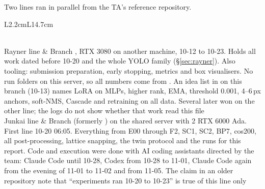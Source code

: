 Two lines ran in parallel from the TA's reference repository.

\begin{lt}{L{2.2cm}L{14.7cm}}
\caption{The two lines of work.}\label{tab:lines}\\
Rayner line & Branch , RTX 3080 on another machine, 10-12 to 10-23. Holds all work dated before 10-20 and the whole YOLO family (\S\ref{sec:rayner}). Also tooling: submission preparation, early stopping, metrics and box visualisers. No run folders on this server, so all numbers come from . An idea list in  on this branch (10-13) names LoRA on MLPs, higher rank, EMA, threshold 0.001, 4--6\,px anchors, soft-NMS, Cascade and retraining on all data. Several later won on the other line; the logs do not show whether that work read this file\\
Junkai line & Branch  (formerly ) on the shared server with 2 RTX 6000 Ada. First  line 10-20 06:05. Everything from E00 through F2, SC1, SC2, BP7, cos200, all post-processing, lattice snapping, the twin protocol and the runs for this report. Code and execution were done with AI coding assistants directed by the team: Claude Code until 10-28, Codex from 10-28 to 11-01, Claude Code again from the evening of 11-01 to 11-02 and from 11-05. The claim in an older repository note that ``experiments ran 10-20 to 10-23'' is true of this line only\\
\end{lt}


